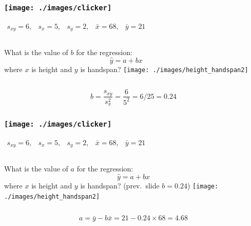 \begin{frame}
\frametitle{\texttt{[image: ./images/clicker]}}
$\begin{array}{ccccc} s_{xy} = 6,&s_x = 5,& s_y = 2,& \bar{x} = 68,& \bar{y} = 21\end{array}$
\begin{columns}[c]
\column{2.5in}
What is the value of $b$ for the regression: $$\hat{y}=a+bx$$
where $x$ is height and $y$ is handspan?
\column{1.8in}
\texttt{[image: ./images/height\_handspan2]}
\end{columns}

\pause

\alert{$$b = \frac{s_{xy}}{s_x^2} = \frac{6}{5^2} = 6/25 = 0.24 $$}
\end{frame}

\begin{frame}
\frametitle{\texttt{[image: ./images/clicker]}}
$\begin{array}{ccccc} s_{xy} = 6,&s_x = 5,& s_y = 2,& \bar{x} = 68,& \bar{y} = 21\end{array}$
\begin{columns}[c]
\column{2.5in}
What is the value of $a$ for the regression: $$\hat{y}=a+bx$$
where $x$ is height and $y$ is handspan? (prev.\ slide $b = 0.24$)
\column{1.8in}
\texttt{[image: ./images/height\_handspan2]}
\end{columns}

\pause

\alert{$$a = \bar{y} - b \bar{x} = 21 - 0.24 \times 68 = 4.68 $$}

\end{frame}


